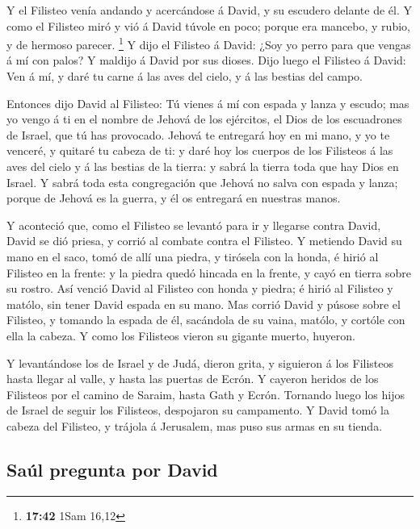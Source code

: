  Y el Filisteo venía andando y acercándose á David, y su
escudero delante de él.  Y como el Filisteo miró y vió á
David túvole en poco; porque era mancebo, y rubio, y de hermoso parecer.
\footnote{\textbf{17:42} 1Sam 16,12}  Y dijo el Filisteo
á David: ¿Soy yo perro para que vengas á mí con palos? Y maldijo á David
por sus dioses.  Dijo luego el Filisteo á David: Ven á
mí, y daré tu carne á las aves del cielo, y á las bestias del campo.

 Entonces dijo David al Filisteo: Tú vienes á mí con
espada y lanza y escudo; mas yo vengo á ti en el nombre de Jehová de los
ejércitos, el Dios de los escuadrones de Israel, que tú has provocado.
 Jehová te entregará hoy en mi mano, y yo te venceré, y
quitaré tu cabeza de ti: y daré hoy los cuerpos de los Filisteos á las
aves del cielo y á las bestias de la tierra: y sabrá la tierra toda que
hay Dios en Israel.  Y sabrá toda esta congregación que
Jehová no salva con espada y lanza; porque de Jehová es la guerra, y él
os entregará en nuestras manos.

 Y aconteció que, como el Filisteo se levantó para ir y
llegarse contra David, David se dió priesa, y corrió al combate contra
el Filisteo.  Y metiendo David su mano en el saco, tomó
de allí una piedra, y tirósela con la honda, é hirió al Filisteo en la
frente: y la piedra quedó hincada en la frente, y cayó en tierra sobre
su rostro.  Así venció David al Filisteo con honda y
piedra; é hirió al Filisteo y matólo, sin tener David espada en su mano.
 Mas corrió David y púsose sobre el Filisteo, y tomando
la espada de él, sacándola de su vaina, matólo, y cortóle con ella la
cabeza. Y como los Filisteos vieron su gigante muerto, huyeron.

 Y levantándose los de Israel y de Judá, dieron grita, y
siguieron á los Filisteos hasta llegar al valle, y hasta las puertas de
Ecrón. Y cayeron heridos de los Filisteos por el camino de Saraim, hasta
Gath y Ecrón.  Tornando luego los hijos de Israel de
seguir los Filisteos, despojaron su campamento.  Y David
tomó la cabeza del Filisteo, y trájola á Jerusalem, mas puso sus armas
en su tienda.

\hypertarget{sauxfal-pregunta-por-david}{%
\subsection{Saúl pregunta por David}\label{sauxfal-pregunta-por-david}}

